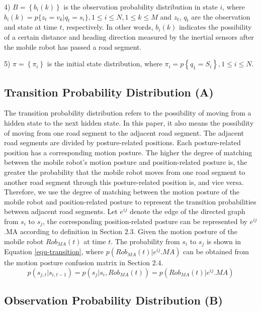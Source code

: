 \documentclass{llncs}
\begin{document}
4) $B = \left\{ {{b_i}(k)} \right\}$ is the observation probability distribution in state $i$, where ${b_i}(k) = p\{ {z_t} = {v_k}|{q_t} = {s_i}\},1 \le i \le N,1 \le k \le M$ and $z_t$, $q_t$ are the observation and state at time $t$, respectively. In other words, ${b_i}(k)$ indicates the possibility of a certain distance and heading direction measured by the inertial sensors after the mobile robot has passed a road segment.

5) $\pi  = \left\{ {{\pi _i}} \right\}$ is the initial state distribution, where ${\pi _i} = p\left\{ {{q_1} = {S_i}} \right\},1 \le i \le N$.

\subsection{Transition Probability Distribution (A)}

The transition probability distribution refers to the possibility of moving from a hidden state to the next hidden state. In this paper, it also means the possibility of moving from one road segment to the adjacent road segment. The adjacent road segments are divided by posture-related positions. Each posture-related position has a corresponding motion posture. The higher the degree of matching between the mobile robot's motion posture and position-related posture is, the greater the probability that the mobile robot moves from one road segment to another road segment through this posture-related position is, and vice versa. Therefore, we use the degree of matching between the motion posture of the mobile robot and position-related posture to represent the transition probabilities between adjacent road segments. Let $e^{ij}$ denote the edge of the directed graph from $s_i$ to $s_j$, the corresponding position-related posture can be represented by $e^{ij}$.MA according to definition in Section $2.3$. Given the motion posture of the mobile robot $Rob_{MA}(t)$ at time $t$. The probability from $s_i$ to $s_j$ is shown in Equation \ref{equ-transition}, where $p(Ro{b_{MA}}(t)|{e^{ij}}.MA)$ can be obtained from the motion posture confusion matrix in Section $2.4$.
\begin{equation}
     \label{equ-transition}
	p({s_{j,t}}|{s_{i,t - 1}}) = p({s_j}|{s_i},Ro{b_{MA}}(t)) = p(Ro{b_{MA}}(t)|{e^{ij}}.MA)
\end{equation}

\subsection{Observation Probability Distribution (B)}
\end{document}
